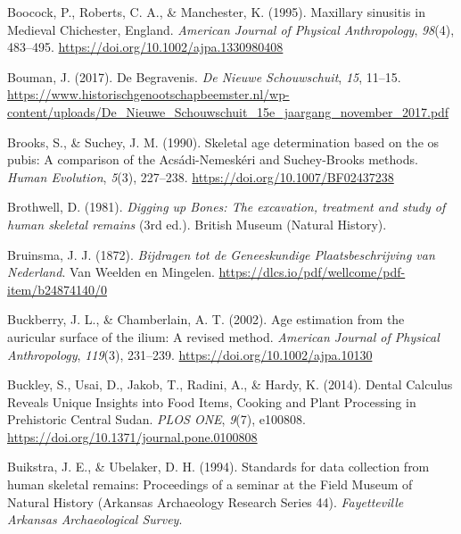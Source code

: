 \documentclass[
]{article}
\newlength{\cslhangindent}
\newlength{\cslentryspacingunit} %
\newenvironment{CSLReferences}[2] %
 {%
  \setlength{\parindent}{0pt}
  \ifodd #1
  \let\oldpar\par
  \def\par{\hangindent=\cslhangindent\oldpar}
  \fi
  \setlength{\parskip}{#2\cslentryspacingunit}
 }%
 {}
\begin{document}
\begin{CSLReferences}{1}{0}
\leavevmode{}%
Boocock, P., Roberts, C. A., \& Manchester, K. (1995). Maxillary
sinusitis in {Medieval Chichester}, {England}. \emph{American Journal of
Physical Anthropology}, \emph{98}(4), 483--495.
\url{https://doi.org/10.1002/ajpa.1330980408}

\leavevmode{}%
Bouman, J. (2017). De Begravenis. \emph{De Nieuwe Schouwschuit},
\emph{15}, 11--15.
\url{https://www.historischgenootschapbeemster.nl/wp-content/uploads/De_Nieuwe_Schouwschuit_15e_jaargang_november_2017.pdf}

\leavevmode{}%
Brooks, S., \& Suchey, J. M. (1990). Skeletal age determination based on
the os pubis: {A} comparison of the {Acsádi-Nemeskéri} and
{Suchey-Brooks} methods. \emph{Human Evolution}, \emph{5}(3), 227--238.
\url{https://doi.org/10.1007/BF02437238}

\leavevmode{}%
Brothwell, D. (1981). \emph{Digging up {Bones}: {The} excavation,
treatment and study of human skeletal remains} (3rd ed.). {British
Museum (Natural History)}.

\leavevmode{}%
Bruinsma, J. J. (1872). \emph{Bijdragen tot de {Geneeskundige
Plaatsbeschrijving} van {Nederland}}. {Van Weelden en Mingelen}.
\url{https://dlcs.io/pdf/wellcome/pdf-item/b24874140/0}

\leavevmode{}%
Buckberry, J. L., \& Chamberlain, A. T. (2002). Age estimation from the
auricular surface of the ilium: A revised method. \emph{American Journal
of Physical Anthropology}, \emph{119}(3), 231--239.
\url{https://doi.org/10.1002/ajpa.10130}

\leavevmode{}%
Buckley, S., Usai, D., Jakob, T., Radini, A., \& Hardy, K. (2014).
Dental {Calculus Reveals Unique Insights} into {Food Items}, {Cooking}
and {Plant Processing} in {Prehistoric Central Sudan}. \emph{PLOS ONE},
\emph{9}(7), e100808. \url{https://doi.org/10.1371/journal.pone.0100808}

\leavevmode{}%
Buikstra, J. E., \& Ubelaker, D. H. (1994). Standards for data
collection from human skeletal remains: {Proceedings} of a seminar at
the {Field Museum} of {Natural History} ({Arkansas Archaeology Research
Series} 44). \emph{Fayetteville Arkansas Archaeological Survey}.


\end{CSLReferences}
\end{document}
